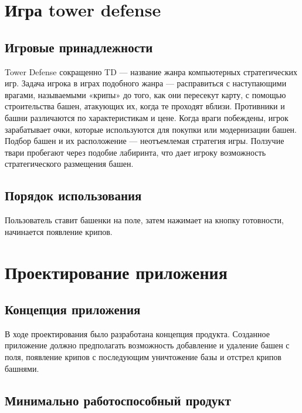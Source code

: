 





\tableofcontents
\newpage



\section{Игра tower defense}

\subsection{Игровые принадлежности}

Tower Defense сокращенно TD — название жанра компьютерных стратегических игр. Задача игрока в играх подобного жанра — расправиться с наступающими врагами, называемыми «крипы» до того, как они пересекут карту, с помощью строительства башен, атакующих их, когда те проходят вблизи. Противники и башни различаются по характеристикам и цене. Когда враги побеждены, игрок зарабатывает очки, которые используются для покупки или модернизации башен. Подбор башен и их расположение — неотъемлемая стратегия игры. Ползучие твари пробегают через подобие лабиринта, что дает игроку возможность стратегического размещения башен.

\subsection{Порядок использования}

Пользователь ставит башенки на поле, затем нажимает на кнопку готовности, начинается появление крипов. 

\section{Проектирование приложения}

\subsection{Концепция приложения} 

В ходе проектирования было разработана концепция продукта.
Созданное приложение должно предполагать возможность добавление и удаление башен с поля, появление крипов с последующим уничтожение базы и отстрел крипов башнями.

\subsection{Минимально работоспособный продукт}

